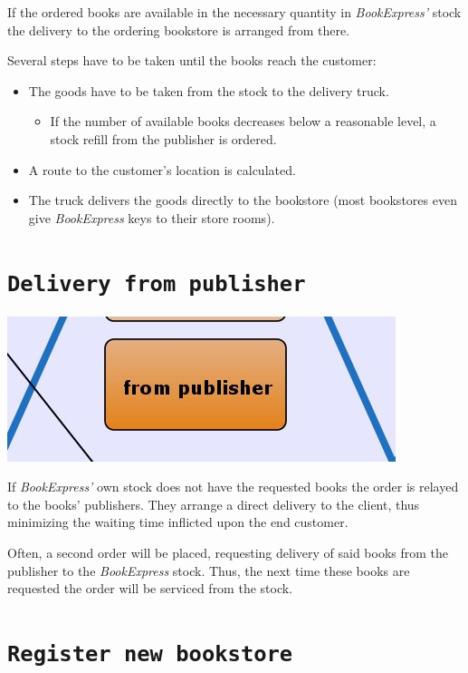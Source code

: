 If the ordered books are available in the necessary quantity in \emph{BookExpress'} stock the delivery to the ordering bookstore is
arranged from there.

Several steps have to be taken until the books reach the customer:
\begin{itemize}
	\item The goods have to be taken from the stock to the delivery truck.
		\begin{itemize}
			\item If the number of available books decreases below a reasonable level, a stock refill from the publisher is ordered.
		\end{itemize}
	\item A route to the customer's location is calculated.
	\item The truck delivers the goods directly to the bookstore (most bookstores even give \emph{BookExpress} keys to their store rooms).
\end{itemize}


\section{\texttt{Delivery from publisher}}                             

\includegraphics[scale=0.8]{screenshots/Arange_delivery_from_publisher.jpeg}

If \emph{BookExpress'} own stock does not have the requested books the order is relayed to the books' publishers. They arrange a direct delivery
to the client, thus minimizing the waiting time inflicted upon the end customer.

Often, a second order will be placed, requesting delivery of said books from the publisher to the \emph{BookExpress} stock. Thus, the next time these
books are requested the order will be serviced from the stock.


\section{\texttt{Register new bookstore}}

